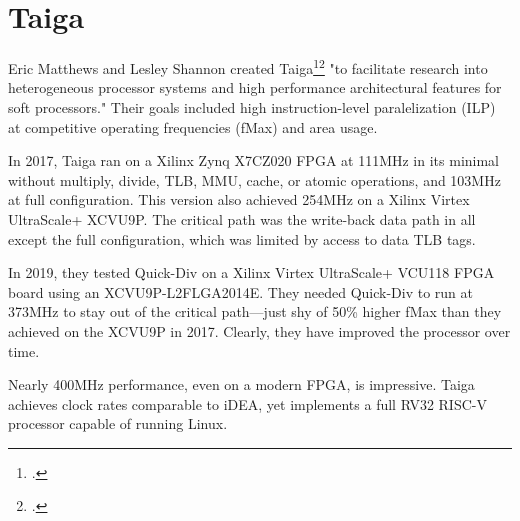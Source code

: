 \chapter{Taiga}

Eric Matthews and Lesley Shannon created
Taiga\footcite{Matthews2017}\footcite{Matthews2017b} "to facilitate research
into heterogeneous processor systems and high performance architectural
features for soft processors."  Their goals included high instruction-level
paralelization (ILP) at competitive operating frequencies (fMax) and area
usage.

In 2017, Taiga ran on a Xilinx Zynq X7CZ020 FPGA at 111MHz in its minimal
without multiply, divide, TLB, MMU, cache, or atomic operations, and 103MHz at
full configuration.  This version also achieved 254MHz on a Xilinx Virtex
UltraScale+ XCVU9P.  The critical path was the write-back data path in all
except the full configuration, which was limited by access to data TLB tags.

In 2019, they tested Quick-Div on a Xilinx Virtex UltraScale+ VCU118 FPGA board
using an XCVU9P-L2FLGA2014E.  They needed Quick-Div to run at 373MHz to stay
out of the critical path—just shy of 50\% higher fMax than they achieved on the
XCVU9P in 2017.  Clearly, they have improved the processor over time.

Nearly 400MHz performance, even on a modern FPGA, is impressive.  Taiga
achieves clock rates comparable to iDEA, yet implements a full RV32 RISC-V
processor capable of running Linux.

